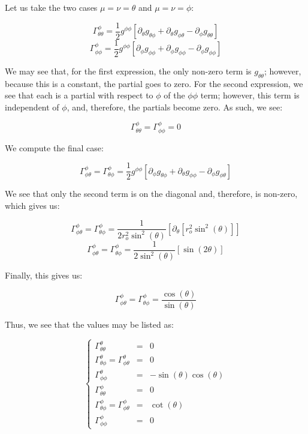\begin{enumerate}
\begin{enumerate}
        Let us take the two cases $\mu=\nu=\theta$ and $\mu=\nu=\phi$:

        $$\Gamma^{\phi}_{\theta\theta}=\frac{1}{2}g^{\phi\phi}\left[ \partial_{\theta}g_{\theta\phi}+\partial_{\theta}g_{\phi\theta}-\partial_{\phi}g_{\theta\theta} \right]$$
        $$\Gamma^{\phi}_{\phi\phi}=\frac{1}{2}g^{\phi\phi}\left[ \partial_{\phi}g_{\phi\phi}+\partial_{\phi}g_{\phi\phi}-\partial_{\phi}g_{\phi\phi} \right]$$

        We may see that, for the first expression, the only non-zero term is $g_{\theta\theta}$; however, because this is a constant, the partial goes to zero. For the second expression, we see that each is a partial with respect to $\phi$ of the $\phi\phi$ term; however, this term is independent of $\phi$, and, therefore, the partials become zero. As such, we see:

        $$\boxed{\Gamma^{\phi}_{\theta\theta}=\Gamma^{\phi}_{\phi\phi}=0}$$

        We compute the final case:

        $$\Gamma^{\phi}_{\phi\theta}=\Gamma^{\phi}_{\theta\phi}=\frac{1}{2}g^{\phi\phi}\left[ \partial_{\phi}g_{\theta\phi}+\partial_{\theta}g_{\phi\phi}-\partial_{\phi}g_{\phi\theta} \right]$$

        We see that only the second term is on the diagonal and, therefore, is non-zero, which gives us:

        $$\Gamma^{\phi}_{\phi\theta}=\Gamma^{\phi}_{\theta\phi}=\frac{1}{2r_o^2\sin^2(\theta)}\left[ \partial_{\theta}[r_o^2\sin^2(\theta)] \right]$$
        $$\Gamma^{\phi}_{\phi\theta}=\Gamma^{\phi}_{\theta\phi}=\frac{1}{2\sin^2(\theta)}\left[ \sin(2\theta) \right]$$

        Finally, this gives us:

        $$\boxed{\Gamma^{\phi}_{\phi\theta}=\Gamma^{\phi}_{\theta\phi}=\frac{\cos(\theta)}{\sin(\theta)}}$$

        Thus, we see that the values may be listed as:

        $$\boxed{\left\{\begin{array}{lll} \Gamma^{\theta}_{\theta\theta}&=&0\\\Gamma^{\theta}_{\theta\phi}=\Gamma^{\theta}_{\phi\theta}&=&0\\\Gamma^{\theta}_{\phi\phi}&=&-\sin(\theta)\cos(\theta)\\\Gamma^{\phi}_{\theta\theta}&=&0\\\Gamma^{\phi}_{\theta\phi}=\Gamma^{\phi}_{\phi\theta}&=&\cot(\theta)\\\Gamma^{\phi}_{\phi\phi}&=&0\end{array}}$$


\end{enumerate}
\end{enumerate}
